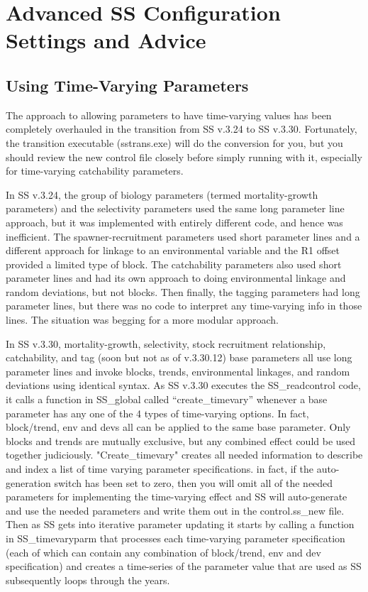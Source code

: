 \section{Advanced SS Configuration Settings and Advice}

\hypertarget{TVpara}{}
\subsection{Using Time-Varying Parameters}
The approach to allowing parameters to have time-varying values has been completely overhauled in the transition from SS v.3.24 to SS v.3.30.  Fortunately, the transition executable (sstrans.exe) will do the conversion for you, but you should review the new control file closely before simply running with it, especially for time-varying catchability parameters.

In SS v.3.24, the group of biology parameters (termed mortality-growth parameters) and the selectivity parameters used the same long parameter line approach, but it was implemented with entirely different code, and hence was inefficient. The spawner-recruitment parameters used short parameter lines and a different approach for linkage to an environmental variable and the R1 offset provided a limited type of block. The catchability parameters also used short parameter lines and had its own approach to doing environmental linkage and random deviations, but not blocks. Then finally, the tagging parameters had long parameter lines, but there was no code to interpret any time-varying info in those lines.  The situation was begging for a more modular approach.

In SS v.3.30, mortality-growth, selectivity, stock recruitment relationship, catchability, and tag (soon but not as of v.3.30.12) base parameters all use long parameter lines and invoke blocks, trends, environmental linkages, and random deviations using identical syntax.  As SS v.3.30 executes the SS\_readcontrol code, it calls a function in SS\_global called “create\_timevary” whenever a base parameter has any one of the 4 types of time-varying options.  In fact, block/trend, env and devs all can be applied to the same base parameter. Only blocks and trends are mutually exclusive, but any combined effect could be used together judiciously.  "Create\_timevary" creates all needed information to describe and index a list of time varying parameter specifications.  in fact, if the auto-generation switch has been set to zero, then you will omit all of the needed parameters for implementing the time-varying effect and SS will auto-generate and use the needed parameters and write them out in the control.ss\_new file. Then as SS gets into iterative parameter updating it starts by calling a function in SS\_timevaryparm that processes each time-varying parameter specification (each of which can contain any combination of block/trend, env and dev specification) and creates a time-series of the parameter value that are used as SS subsequently loops through the years.


